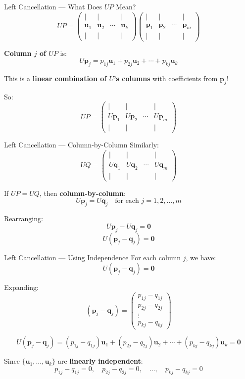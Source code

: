 \documentclass[10pt]{beamer}
\theoremstyle{definition}
\newcommand{\x}[1]{\alert{\textbf{#1}}}
\begin{document}
\begin{frame}{Left Cancellation — What Does $UP$ Mean?}
$$UP = \begin{pmatrix} | & | & & | \\ \mathbf{u}_1 & \mathbf{u}_2 & \cdots & \mathbf{u}_k \\ | & | & & | \end{pmatrix}\begin{pmatrix} | & | & & | \\ \mathbf{p}_1 & \mathbf{p}_2 & \cdots & \mathbf{p}_m \\ | & | & & | \end{pmatrix}$$

\vfill
\x{Column $j$ of $UP$} is:
$$U\mathbf{p}_j = p_{1j}\mathbf{u}_1 + p_{2j}\mathbf{u}_2 + \cdots + p_{kj}\mathbf{u}_k$$

\vfill
This is a \x{linear combination of $U$'s columns} with coefficients from $\mathbf{p}_j$!

\vfill
So:
$$UP = \begin{pmatrix} | & | & & | \\ U\mathbf{p}_1 & U\mathbf{p}_2 & \cdots & U\mathbf{p}_m \\ | & | & & | \end{pmatrix}$$
\end{frame}

\begin{frame}{Left Cancellation — Column-by-Column}
Similarly:
$$UQ = \begin{pmatrix} | & | & & | \\ U\mathbf{q}_1 & U\mathbf{q}_2 & \cdots & U\mathbf{q}_m \\ | & | & & | \end{pmatrix}$$

\vfill
If $UP = UQ$, then \x{column-by-column}:
$$U\mathbf{p}_j = U\mathbf{q}_j \quad \text{for each } j = 1, 2, \ldots, m$$

\vfill
Rearranging:
$$U\mathbf{p}_j - U\mathbf{q}_j = \mathbf{0}$$
$$U(\mathbf{p}_j - \mathbf{q}_j) = \mathbf{0}$$
\end{frame}

\begin{frame}{Left Cancellation — Using Independence}
For each column $j$, we have:
$$U(\mathbf{p}_j - \mathbf{q}_j) = \mathbf{0}$$

\vfill
Expanding:
$$(\mathbf{p}_j - \mathbf{q}_j) = \begin{pmatrix} p_{1j} - q_{1j} \\ p_{2j} - q_{2j} \\ \vdots \\ p_{kj} - q_{kj} \end{pmatrix}$$

$$U(\mathbf{p}_j - \mathbf{q}_j) = (p_{1j} - q_{1j})\mathbf{u}_1 + (p_{2j} - q_{2j})\mathbf{u}_2 + \cdots + (p_{kj} - q_{kj})\mathbf{u}_k = \mathbf{0}$$

\vfill
Since $\{\mathbf{u}_1, \ldots, \mathbf{u}_k\}$ are \x{linearly independent}:
$$p_{1j} - q_{1j} = 0, \quad p_{2j} - q_{2j} = 0, \quad \ldots, \quad p_{kj} - q_{kj} = 0$$
\end{frame}
\end{document}
